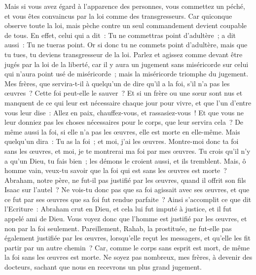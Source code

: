 \begin{multicols}{2}
Mais si vous avez égard à l'apparence des personnes, vous commettez un péché, et vous êtes convaincus par la loi comme des transgresseurs.
Car quiconque observe toute la loi, mais pèche contre un seul commandement devient coupable de tous.
En effet, celui qui a dit~: Tu ne commettras point d'adultère~; a dit aussi~: Tu ne tueras point. Or si donc tu ne commets point d'adultère, mais que tu tues, tu deviens transgresseur de la loi.
Parlez et agissez comme devant être jugés par la loi de la liberté,
car il y aura un jugement sans miséricorde sur celui qui n'aura point usé de miséricorde~; mais la miséricorde triomphe du jugement.
Mes frères, que servira-t-il à quelqu'un de dire qu'il a la foi, s'il n'a pas les œuvres~? Cette foi peut-elle le sauver~?
Et si un frère ou une sœur sont nus et manquent de ce qui leur est nécessaire chaque jour pour vivre,
et que l'un d'entre vous leur dise~: Allez en paix, chauffez-vous, et rassasiez-vous~! Et que vous ne leur donniez pas les choses nécessaires pour le corps, que leur servira cela~?
De même aussi la foi, si elle n'a pas les œuvres, elle est morte en elle-même.
Mais quelqu'un dira~: Tu as la foi~; et moi, j'ai les œuvres. Montre-moi donc ta foi sans les œuvres, et moi, je te montrerai ma foi par mes œuvres.
Tu crois qu'il n'y a qu'un Dieu, tu fais bien~; les démons le croient aussi, et ils tremblent.
Mais, ô homme vain, veux-tu savoir que la foi qui est sans les œuvres est morte~?
Abraham, notre père, ne fut-il pas justifié par les œuvres, quand il offrit son fils Isaac sur l'autel~?
Ne vois-tu donc pas que sa foi agissait avec ses œuvres, et que ce fut par ses œuvres que sa foi fut rendue parfaite~?
Ainsi s'accomplit ce que dit l'Ecriture~: Abraham crut en Dieu, et cela lui fut imputé à justice, et il fut appelé ami de Dieu.
Vous voyez donc que l'homme est justifié par les œuvres, et non par la foi seulement.
Pareillement, Rahab, la prostituée, ne fut-elle pas également justifiée par les œuvres, lorsqu'elle reçut les messagers, et qu'elle les fit partir par un autre chemin~?
Car, comme le corps sans esprit est mort, de même la foi sans les œuvres est morte.
\VerseOne{}Ne soyez pas nombreux, mes frères, à devenir des docteurs, sachant que nous en recevrons un plus grand jugement.

\end{multicols}
